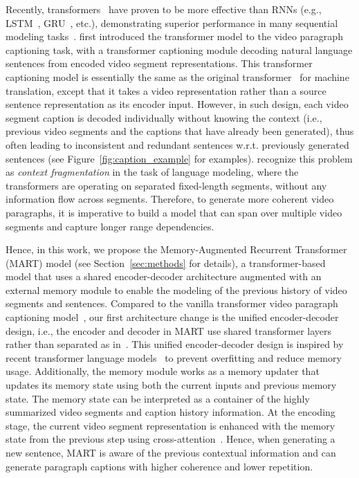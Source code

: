 \documentclass[11pt,a4paper]{article}
\begin{document}
Recently, transformers~\cite{vaswani2017attention} have proven to be more effective than RNNs (e.g., LSTM~\cite{hochreiter1997long}, GRU~\cite{chung2014empirical}, etc.), demonstrating superior performance in many sequential modeling tasks~\cite{vaswani2017attention, zhou2018end, devlin2018bert, dai2019transformer, yang2019xlnet}. 
\citet{zhou2018end} first introduced the transformer model to the video paragraph captioning task, with a transformer captioning module decoding natural language sentences from encoded video segment representations. 
This transformer captioning model is essentially the same as the original transformer~\cite{vaswani2017attention} for machine translation, except that it takes a video representation rather than a source sentence representation as its encoder input.
However, in such design, each video segment caption is decoded individually without knowing the context (i.e., previous video segments and the captions that have already been generated), thus often leading to inconsistent and redundant sentences w.r.t. previously generated sentences (see Figure~\ref{fig:caption_example} for examples).
\citet{dai2019transformer} recognize this problem as \textit{context fragmentation} in the task of language modeling, where the transformers are operating on separated fixed-length segments, without any information flow across segments.
Therefore, to generate more coherent video paragraphs, it is imperative to build a model that can span over multiple video segments and capture longer range dependencies.

Hence, in this work, we propose the Memory-Augmented Recurrent Transformer (MART) model (see Section~\ref{sec:methods} for details), a transformer-based model that uses a shared encoder-decoder architecture augmented with an external memory module to enable the modeling of the previous history of video segments and  sentences. 
Compared to the vanilla transformer video paragraph captioning model~\cite{zhou2018end}, our first architecture change is the unified encoder-decoder design, i.e., the encoder and decoder in MART use shared transformer layers rather than separated as in~\citet{zhou2018end, vaswani2017attention}.
This unified encoder-decoder design is inspired by recent transformer language models~\cite{devlin2018bert, dai2019transformer, sun2019videobert} to prevent overfitting and reduce memory usage. 
Additionally, the memory module works as a memory updater that updates its memory state using both the current inputs and previous memory state.
The memory state can be interpreted as a container of the highly summarized video segments and caption history information.
At the encoding stage, the current video segment representation is enhanced with the memory state from the previous step using cross-attention~\cite{vaswani2017attention}. Hence, when generating a new sentence, MART is aware of the previous contextual information and can generate paragraph captions with higher coherence and lower repetition.
\end{document}
